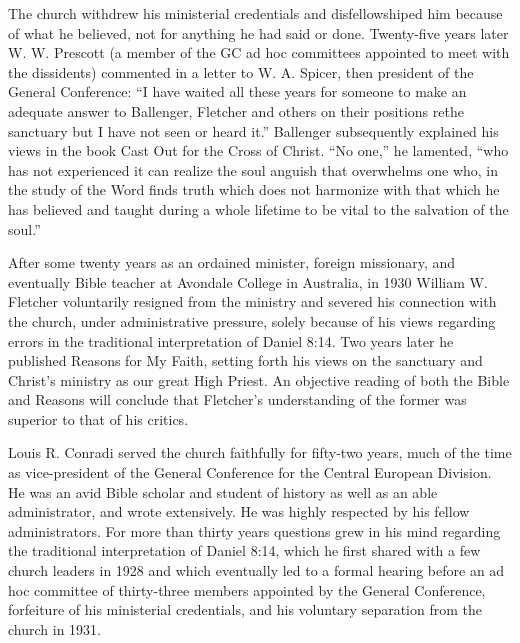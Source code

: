 The church withdrew his ministerial credentials and disfellowshiped him
because of what he believed, not for anything he had said or done.
Twenty-five years later W. W. Prescott (a member of the GC ad hoc committees
appointed to meet with the dissidents) commented in a letter to W. A.
Spicer, then president of the General Conference: ``I have waited all these
years for someone to make an adequate answer to Ballenger, Fletcher and
others on their positions re\. the sanctuary but I have not seen or heard
it.'' Ballenger subsequently explained his views in the book Cast Out for the
Cross of Christ. ``No one,'' he lamented, ``who has not experienced it can
realize the soul anguish that overwhelms one who, in the study of the Word
finds truth which does not harmonize with that which he has believed and
taught during a whole lifetime to be vital to the salvation of the 
soul.''

After some twenty years as an ordained minister, foreign missionary, and
eventually Bible teacher at Avondale College in Australia, in 1930 William
W. Fletcher voluntarily resigned from the ministry and severed his
connection with the church, under administrative pressure, solely because of
his views regarding errors in the traditional interpretation of Daniel 8:14.
Two years later he published Reasons for My Faith, setting forth his views
on the sanctuary and Christ's ministry as our great High Priest. An
objective reading of both the Bible and Reasons will conclude that
Fletcher's understanding of the former was superior to that of his
critics.

Louis R. Conradi served the church faithfully for fifty-two years, much of
the time as vice-president of the General Conference for the Central
European Division. He was an avid Bible scholar and student of history as
well as an able administrator, and wrote extensively. He was highly
respected by his fellow administrators. For more than thirty years questions
grew in his mind regarding the traditional interpretation of Daniel 8:14,
which he first shared with a few church leaders in 1928 and which eventually
led to a formal hearing before an ad hoc committee of thirty-three members
appointed by the General Conference, forfeiture of his ministerial
credentials, and his voluntary separation from the church in 1931. 

